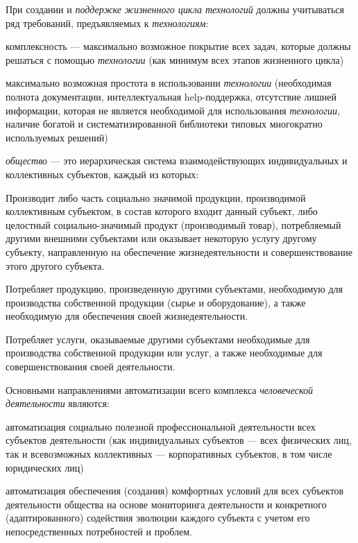 При создании и \textit{поддержке жизненного цикла технологий} должны учитываться ряд требований, предъявляемых к  \textit{технологиям}:

\begin{textitemize}
	\item
	комплексность --- максимально возможное покрытие всех задач, которые должны решаться с помощью \textit{технологии} (как минимум всех этапов жизненного цикла)
	\item
	максимально возможная простота в использовании \textit{технологии} (необходимая полнота документации, интеллектуальная help-поддержка, отсутствие лишней информации, которая не является необходимой для использования \textit{технологии}, наличие богатой и систематизированной библиотеки типовых многократно используемых решений)
\end{textitemize}

\textit{общество} --- это иерархическая система взаимодействующих индивидуальных и коллективных субъектов, каждый из которых:

\begin{textitemize}
	\item
	Производит либо часть социально значимой продукции, производимой коллективным субъектом, в состав которого входит данный субъект, либо целостный социально-значимый продукт (производимый товар), потребляемый другими внешними субъектами или оказывает некоторую услугу другому субъекту, направленную на обеспечение жизнедеятельности и совершенствование этого другого субъекта.
	\item
	Потребляет продукцию, произведенную другими субъектами, необходимую для производства собственной продукции (сырье и оборудование), а также необходимую для обеспечения своей жизнедеятельности.
	\item
	Потребляет услуги, оказываемые другими субъектами необходимые для производства собственной продукции или услуг, а также необходимые для совершенствования своей деятельности.
\end{textitemize}

Основными направлениями автоматизации всего комплекса \textit{человеческой деятельности} являются:

\begin{textitemize}
	\item	
	автоматизация социально полезной профессиональной деятельности всех субъектов деятельности (как индивидуальных субъектов --- всех физических лиц, так и всевозможных коллективных --- корпоративных субъектов, в том числе юридических лиц)
	
	\item	
	автоматизация обеспечения (создания) комфортных условий для всех субъектов деятельности общества на основе мониторинга деятельности и конкретного (адаптированного) содействия эволюции каждого субъекта с учетом его непосредственных потребностей и проблем.
	
\end{textitemize}

